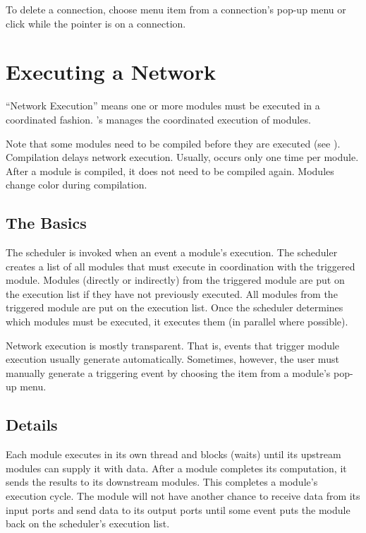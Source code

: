 To delete a connection, choose menu item  from a
connection's pop-up menu or click  while the
pointer is on a connection.

\section{Executing a Network}
\label{sec:executenet}

``Network Execution'' means one or more modules must be executed in a
coordinated fashion. 
\sr{}'s  manages the coordinated execution of modules.

Note that some modules need to be compiled before they are
executed (see ).  Compilation
delays network execution.  Usually, occurs only one time
per module.  After a module is compiled, it does not need to be
compiled again.  Modules change color during compilation.

\subsection{The Basics}

The scheduler is invoked when an event  a
module's execution.  The scheduler creates a list of all modules that
must execute in coordination with the triggered module. Modules
 (directly or indirectly) from the triggered module are 
put on the execution list if they have not previously executed.
All modules  from the triggered module are put
on the execution list.  Once the scheduler determines which modules must be
executed, it executes them (in parallel where possible).

Network execution is mostly transparent.  That is, events that trigger
module execution usually generate automatically. Sometimes,
however, the user must manually
generate a triggering event by choosing the  item from a
module's pop-up menu.

\subsection{Details}

Each module executes in its own thread and blocks (waits) until its upstream
modules can supply it with data.  After a module completes its computation,
it sends the results to its downstream modules.  This completes a module's
execution cycle.  The module will not have another chance to receive data from its input ports
and send data to its output ports until some event
puts the  module back on the scheduler's execution list.  

